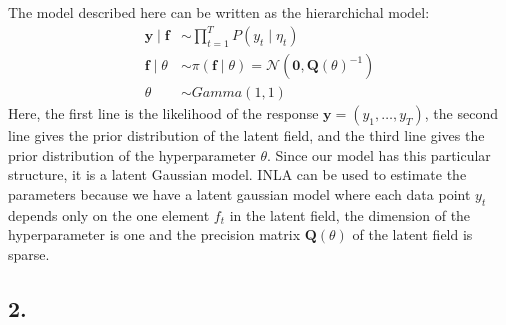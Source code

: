 \documentclass[
]{article}
\begin{document}
The model described here can be written as the hierarchichal model: \[
  \begin{aligned}
    \mathbf{y}\mid\mathbf{f} &\sim \prod_{t=1}^T P(y_t\mid \eta_t) \\
    \mathbf{f}\mid\theta &\sim \pi(\mathbf{f}\mid\theta) = \mathcal{N}(\mathbf{0},\mathbf{Q}(\theta)^{-1}) \\
    \theta &\sim Gamma(1,1)
  \end{aligned}
\] Here, the first line is the likelihood of the response
\(\mathbf{y}=(y_1,\ldots,y_T)\), the second line gives the prior
distribution of the latent field, and the third line gives the prior
distribution of the hyperparameter \(\theta\). Since our model has this
particular structure, it is a latent Gaussian model. INLA can be used to
estimate the parameters because we have a latent gaussian model where
each data point \(y_t\) depends only on the one element \(f_t\) in the
latent field, the dimension of the hyperparameter is one and the
precision matrix \(\mathbf{Q}(\theta)\) of the latent field is sparse.

\hypertarget{section-1}{%
\subsection{2.}\label{section-1}}
\end{document}

